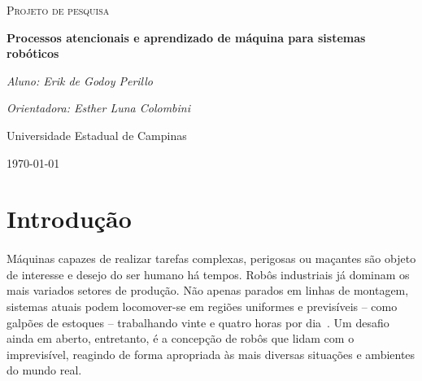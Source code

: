 \documentclass[11pt]{article}
\begin{document}
\begin{titlepage}
	\centering
	{\scshape\Large Projeto de pesquisa\par}
	\vspace{1.5cm}
	{\huge\bfseries Processos atencionais e aprendizado de máquina 
		para sistemas robóticos\par}
	\vspace{1cm}
	{\itshape Aluno: Erik de Godoy Perillo\par}
	{\itshape Orientadora: Esther Luna Colombini\par}
	\vspace{0.5cm}
	\begin{abstract}
		Entender o ambiente ao seu redor é uma tarefa fundamental para 
		o desafio de se obter máquinas autônomas que interagem com o 
		mundo de forma semelhante à nossa.
		A alta dimensionalidade dos dados captados por sensores usados para 
		este fim é em geral problemática, pois muitas vezes há
		redundância e irrelevância de informação. 
		Neste projeto, propomos o uso de processos atencionais em cascata 
		com aprendizado de máquina a fim de se obter um sistema de 
		identificação de classificação de entidades
		que seja eficiente, preciso e geral. 
		Por fim, planeja-se implementar uma estrutura que permita o uso das
		técnicas por projetos robóticos em geral com o uso de GPUs embarcadas.
	\end{abstract}
	\vfill
	Universidade Estadual de Campinas 
	\vfill
	{\large \today\par}
\end{titlepage}

\newpage

\section{Introdução}
\paragraph{}
Máquinas capazes de realizar tarefas complexas, perigosas ou maçantes são
objeto de interesse e desejo do ser humano há tempos. 
Robôs industriais já dominam os mais variados setores de produção. 
Não apenas parados em linhas de montagem, sistemas atuais podem locomover-se
em regiões uniformes e previsíveis -- como galpões de estoques -- trabalhando
vinte e quatro horas por dia~\cite{warehouse}.
Um desafio ainda em aberto, entretanto, é a concepção de robôs que lidam com 
o imprevisível, reagindo de forma apropriada às mais diversas situações 
e ambientes do mundo real. 
\end{document}
